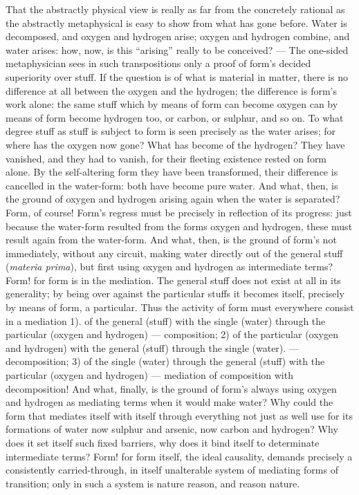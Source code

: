 \documentclass[12pt,a4paper]{book}
\begin{document}
That the abstractly physical view is really as far from the concretely rational
as the abstractly metaphysical is easy to show from what has gone before. Water
is decomposed, and oxygen and hydrogen arise; oxygen and hydrogen combine, and
water arises: how, now, is this ``arising'' really to be conceived? --- The
one-sided metaphysician sees in such transpositions only a proof of form's
decided superiority over stuff. If the question is of what is material in
matter, there is no difference at all between the oxygen and the hydrogen; the
difference is form's work alone: the same stuff which by means of form can
become oxygen can by means of form become hydrogen too, or carbon, or sulphur,
and so on. To what degree stuff as stuff is subject to form is seen precisely
as the water arises; for where has the oxygen now gone? What has become of the
hydrogen? They have vanished, and they had to vanish, for their fleeting
existence rested on form alone. By the self-altering form they have been
transformed, their difference is cancelled in the water-form: both have become
pure water. And what, then, is the ground of oxygen and hydrogen arising again
when the water is separated? Form, of course! Form's regress must be precisely
in reflection of its progress: just because the water-form resulted from the
forms oxygen and hydrogen, these must result again from the water-form. And
what, then, is the ground
of form's not immediately, without any circuit, making water directly out of
the general stuff (\textit{materia prima}), but first using oxygen and hydrogen
as intermediate terms? Form! for form is in the mediation. The general stuff
does not exist at all in its generality; by being over against the particular
stuffs it becomes itself, precisely by means of form, a particular. Thus the
activity of form must everywhere consist in a mediation 1). of the general
(stuff) with the single (water) through the particular (oxygen and hydrogen)
--- composition; 2) of the particular (oxygen and hydrogen) with the general
(stuff) through the single (water). --- decomposition; 3) of the single (water)
through the general (stuff) with the particular (oxygen and hydrogen) ---
mediation of composition with decomposition! And what, finally, is the ground
of form's always using oxygen and hydrogen as mediating terms when it would
make water? Why could the form that mediates itself with itself through
everything not just as well use for its formations of water now sulphur and
arsenic, now carbon and hydrogen? Why does it set itself such fixed barriers,
why does it bind itself to determinate intermediate terms? Form! for form
itself, the ideal causality, demands precisely a consistently carried-through,
in itself unalterable system of mediating forms of transition; only in such a
system is nature reason, and reason nature.
\end{document}
